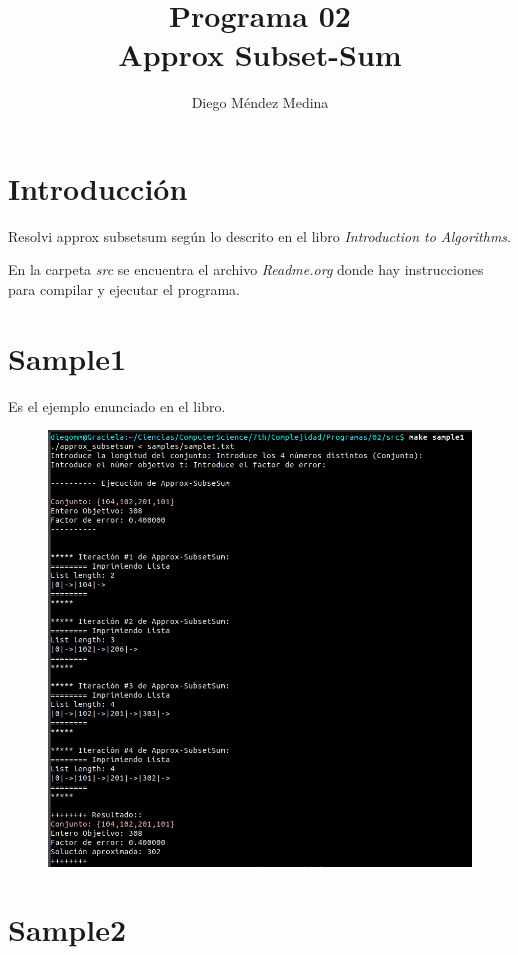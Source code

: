 \documentclass[14pt,letterpaper]{article}
\title{Programa 02 \\ Approx Subset-Sum}
\author{Diego Méndez Medina}
\date{}
\begin{document}
\ttfamily
\maketitle
\rmfamily

\tableofcontents
\printindex
\clearpage

\section{{\sc Introducción}}
Resolvi approx subsetsum según lo descrito en el libro {\it Introduction to
  Algorithms}.

En la carpeta {\it src} se encuentra el archivo {\it Readme.org} donde hay
instrucciones para compilar y ejecutar el programa.

\section {\sc Sample1}

  Es el ejemplo enunciado en el libro.
  \begin{figure}[h]
    \includegraphics[width=15cm]{sample1.png}
    \centering
  \end{figure} 

  \clearpage
\section {\sc Sample2}
\end{document}

